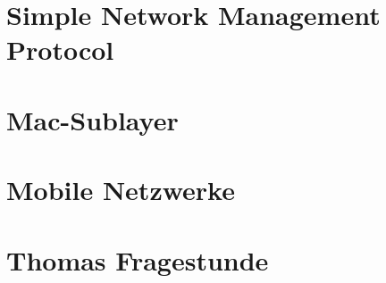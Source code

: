 \documentclass{article} %
\begin{document}
\section{Simple Network Management Protocol}


\section{Mac-Sublayer}


\section{Mobile Netzwerke}



\section{Thomas Fragestunde}
\end{document}
